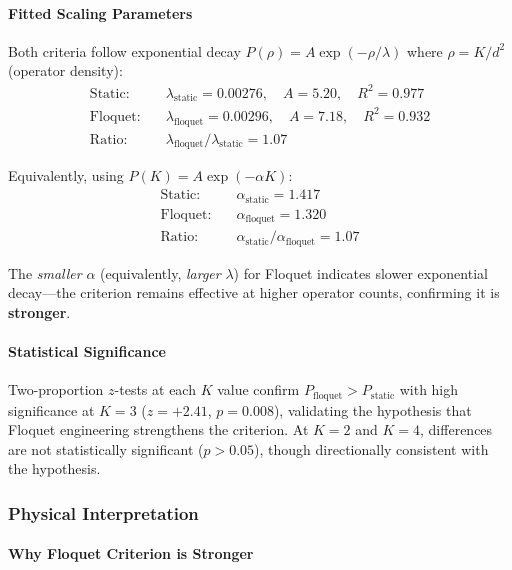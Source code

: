 \paragraph{Fitted Scaling Parameters}

Both criteria follow exponential decay $P(\rho) = A \exp(-\rho/\lambda)$ where $\rho = K/d^2$ (operator density):
\begin{align}
\text{Static:} \quad &\lambda_{\text{static}} = 0.00276, \quad A = 5.20, \quad R^2 = 0.977 \\
\text{Floquet:} \quad &\lambda_{\text{floquet}} = 0.00296, \quad A = 7.18, \quad R^2 = 0.932 \\
\text{Ratio:} \quad &\lambda_{\text{floquet}} / \lambda_{\text{static}} = 1.07
\end{align}

Equivalently, using $P(K) = A \exp(-\alpha K)$:
\begin{align}
\text{Static:} \quad &\alpha_{\text{static}} = 1.417 \\
\text{Floquet:} \quad &\alpha_{\text{floquet}} = 1.320 \\
\text{Ratio:} \quad &\alpha_{\text{static}} / \alpha_{\text{floquet}} = 1.07
\end{align}

The \emph{smaller} $\alpha$ (equivalently, \emph{larger} $\lambda$) for Floquet indicates slower exponential decay—the criterion remains effective at higher operator counts, confirming it is \textbf{stronger}.

\paragraph{Statistical Significance}

Two-proportion $z$-tests at each $K$ value confirm $P_{\text{floquet}} > P_{\text{static}}$ with high significance at $K=3$ ($z = +2.41$, $p = 0.008$), validating the hypothesis that Floquet engineering strengthens the criterion. At $K=2$ and $K=4$, differences are not statistically significant ($p > 0.05$), though directionally consistent with the hypothesis.

\subsubsection{Physical Interpretation}

\paragraph{Why Floquet Criterion is Stronger}

